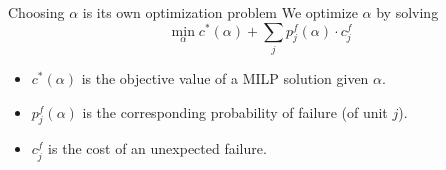 \documentclass[slides]{beamer}
\begin{document}
\begin{frame}{Choosing $\alpha$ is its own optimization problem}
     We optimize $\alpha$ by solving
    \begin{equation*}
    \min_{\alpha} c^*(\alpha) + \sum_{j} p^f_{j}(\alpha)\cdot c_{j}^f
    \end{equation*}
    \begin{itemize}
        \item $c^*(\alpha)$ is the objective value of a MILP solution given $\alpha$.
        \item $p^f_j(\alpha)$ is the corresponding probability of failure (of
            unit $j$).
        \item $c_j^f$ is the cost of an unexpected failure.
    \end{itemize}
\end{frame}
\end{document}
